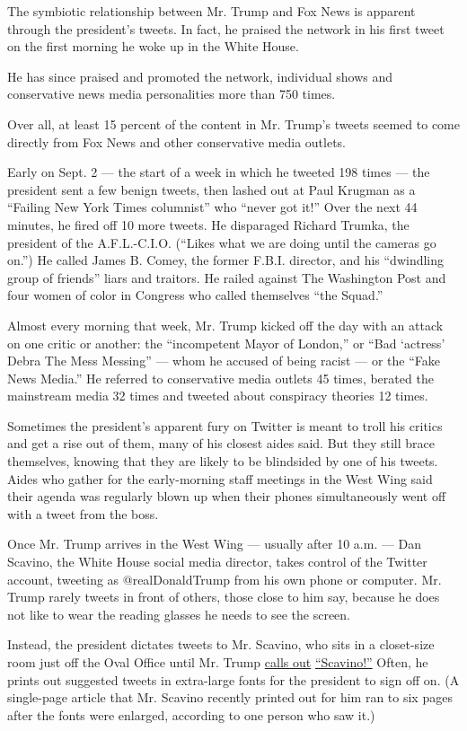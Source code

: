 The symbiotic relationship between Mr. Trump and Fox News is apparent
through the president's tweets. In fact, he praised the network in his
first tweet on the first morning he woke up in the White House.

He has since praised and promoted the network, individual shows and
conservative news media personalities more than 750 times.

Over all, at least 15 percent of the content in Mr. Trump's tweets
seemed to come directly from Fox News and other conservative media
outlets.

Early on Sept. 2 --- the start of a week in which he tweeted 198 times
--- the president sent a few benign tweets, then lashed out at Paul
Krugman as a ``Failing New York Times columnist'' who ``never got it!''
Over the next 44 minutes, he fired off 10 more tweets. He disparaged
Richard Trumka, the president of the A.F.L.-C.I.O. (``Likes what we are
doing until the cameras go on.'') He called James B. Comey, the former
F.B.I. director, and his ``dwindling group of friends'' liars and
traitors. He railed against The Washington Post and four women of color
in Congress who called themselves ``the Squad.''

Almost every morning that week, Mr. Trump kicked off the day with an
attack on one critic or another: the ``incompetent Mayor of London,'' or
``Bad `actress' Debra The Mess Messing'' --- whom he accused of being
racist --- or the ``Fake News Media.'' He referred to conservative media
outlets 45 times, berated the mainstream media 32 times and tweeted
about conspiracy theories 12 times.

Sometimes the president's apparent fury on Twitter is meant to troll his
critics and get a rise out of them, many of his closest aides said. But
they still brace themselves, knowing that they are likely to be
blindsided by one of his tweets. Aides who gather for the early-morning
staff meetings in the West Wing said their agenda was regularly blown up
when their phones simultaneously went off with a tweet from the boss.

Once Mr. Trump arrives in the West Wing --- usually after 10 a.m. ---
Dan Scavino, the White House social media director, takes control of the
Twitter account, tweeting as @realDonaldTrump from his own phone or
computer. Mr. Trump rarely tweets in front of others, those close to him
say, because he does not like to wear the reading glasses he needs to
see the screen.

Instead, the president dictates tweets to Mr. Scavino, who sits in a
closet-size room just off the Oval Office until Mr. Trump
\href{https://www.politico.com/story/2019/05/16/trump-scavino-1327921}{calls
out}
\href{https://www.politico.com/story/2019/05/16/trump-scavino-1327921}{``Scavino!''}
Often, he prints out suggested tweets in extra-large fonts for the
president to sign off on. (A single-page article that Mr. Scavino
recently printed out for him ran to six pages after the fonts were
enlarged, according to one person who saw it.)

